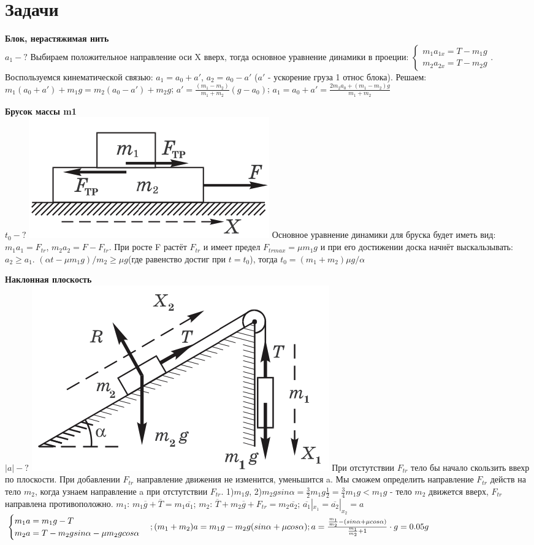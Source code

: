 \documentclass{article}
\begin{document}
\section{Задачи}
\begin{minipage}{.3\textwidth}
\textbf{Блок, нерастяжимая нить}\\
$a_1-?$
Выбираем положительное направление оси X вверх, тогда основное уравнение динамики в проеции:
$
\begin{cases}
    m_1a_{1x}=T-m_1g\\
    m_2a_{2x}=T-m_2g
\end{cases}
$. Воспользуемся кинематической связью: $a_1 =a_0+a'$, $a_2=a_0-a'$ ($a'$ - ускорение груза 1 относ блока). Решаем: $m_1(a_0+a')+m_1g=m_2(a_0-a')+m_2g$; $a'=\frac{(m_1-m_2)}{m_1+m_2}(g-a_0)$; $a_1=a_0+a'=\frac{2m_2a_0+(m_1-m_2)g}{m_1+m_2}$
\end{minipage}
\hfill
\begin{minipage}{.3\textwidth}
\textbf{Брусок массы m1}\\
$t_0-?$
\includegraphics[width=.3\textwidth]{brus.png}
Основное уравнение динамики для бруска будет иметь вид: $m_1a_1=F_{tr}$, $m_2a_2=F-F_{tr}$. При росте F растёт $F_{tr}$ и имеет предел $F_{trmax} = \mu m_1g$ и при его достижении доска начнёт выскальзывать: $a_2\geq a_1$. $(\alpha t -\mu m_1g)/m_2\geq\mu g$(где равенство достиг при $t = t_0$), тогда $t_0=(m_1+m_2)\mu g/\alpha$
\end{minipage}
\hfill
\begin{minipage}{.3\textwidth}
\textbf{Наклонная плоскость}\\
$|a|-?$
\includegraphics[width=.3\textwidth]{plosk.png}
При отстутствии $F_{tr}$ тело бы начало скользить ввехр по плоскости. При добавлении $F_{tr}$ направление движения не изменится, уменьшится a. Мы сможем определить направление $F_{tr}$ действ на тело $m_2$, когда узнаем направление a при отстутствии $F_{tr}$.
1)$m_1g$, 2)$m_2gsin\alpha= \frac{3}{2}m_1g\frac{1}{2}=\frac{3}{4}m_1g<m_1g$ - тело $m_2$ движется вверх, $F_{tr}$ направлена противоположно. 
$m_1$: $m_1\overline{g}+\overline{T}=m_1\overline{a_1}$; $m_2$: $\overline{T}+m_2\overline{g}+F_{tr}=m_2\overline{a_2}$; $\overline{a_1}|_{x_1}=\overline{a_2}|_{x_2}=a$
$
\begin{cases}
    m_1a=m_1g-T\\
    m_2a=T-m_2gsin\alpha-\mu m_2gcos\alpha
\end{cases}\\; (m_1+m_2)a=m_1g-m_2g(sin\alpha+\mu cos\alpha);
a = \frac{\frac{m_1}{m_2}-(sin\alpha+\mu cos\alpha)}{\frac{m_1}{m_2}+1}\cdot g = 0.05g
$
\end{minipage}
\end{document}
